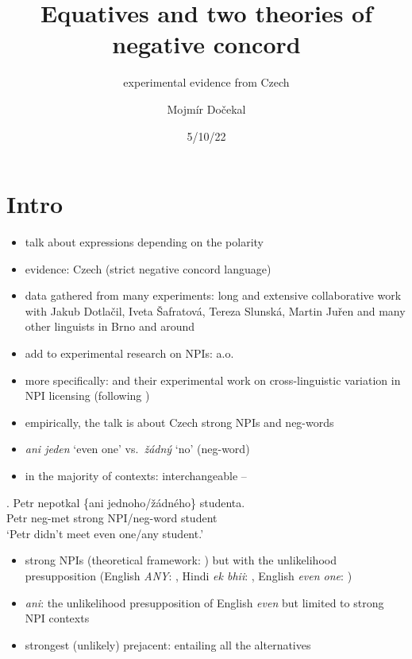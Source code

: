 \documentclass[
  letterpaper,
  DIV=11,
  numbers=noendperiod]{scrartcl}
\title{Equatives and two theories of negative concord}
\subtitle{experimental evidence from Czech}
\author{Mojmír Dočekal}
\date{5/10/22}
\providecommand{\tightlist}{%
  \setlength{\itemsep}{0pt}\setlength{\parskip}{0pt}}\usepackage{longtable,booktabs,array}
\begin{document}
\maketitle
\ifdefined\Shaded\renewenvironment{Shaded}{\begin{tcolorbox}[borderline west={3pt}{0pt}{shadecolor}, boxrule=0pt, breakable, frame hidden, enhanced, interior hidden, sharp corners]}{\end{tcolorbox}}\fi

\hypertarget{intro}{%
\section{Intro}\label{intro}}

\begin{itemize}
\tightlist
\item
  talk about expressions depending on the polarity
\item
  evidence: Czech (strict negative concord language)
\item
  data gathered from many experiments: long and extensive collaborative
  work with Jakub Dotlačil, Iveta Šafratová, Tereza Slunská, Martin
  Juřen and many other linguists in Brno and around
\item
  add to experimental research on NPIs:
  \cite{Chemla-Homer-Rothschild-NPI,gajewski2016another,alexandropoulou2020there}
  a.o.
\item
  more specifically: \cite{djarv2018cognitive,schwarz2020italian} and
  their experimental work on cross-linguistic variation in NPI licensing
  (following \cite{chierchia2019factivity})
\item
  empirically, the talk is about Czech strong NPIs and neg-words
\item
  \emph{ani jeden} `even one' vs.~\textit{žádný} `no' (neg-word)
\item
  in the majority of contexts: interchangeable -- \Next
\end{itemize}

\exg. Petr nepotkal \{ani jednoho/žádného\} studenta.\\
Petr neg-met strong NPI/neg-word student\\
`Petr didn't meet even one/any student.'

\begin{itemize}
\tightlist
\item
  strong NPIs (theoretical framework: \cite{gajewski2011licensing}) but
  with the unlikelihood presupposition (English \emph{ANY}:
  \cite{krifka1995semantics}, Hindi \emph{ek bhii}:
  \cite{lahiri1998focus}, English \emph{even one}: \cite{crnivc2014non})
\item
  \emph{ani}: the unlikelihood presupposition of English \emph{even} but
  limited to strong NPI contexts
\item
  strongest (unlikely) prejacent: entailing all the alternatives
\end{itemize}
\end{document}
